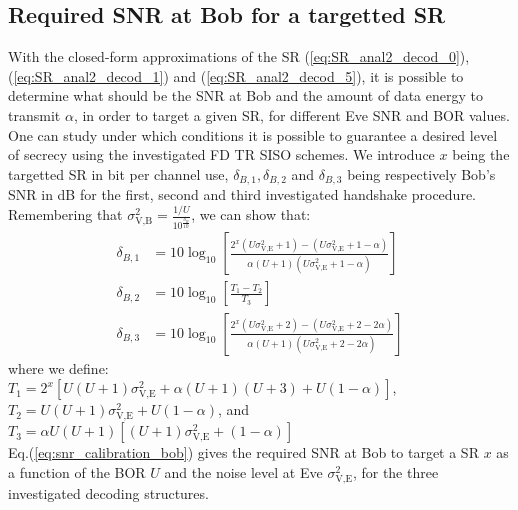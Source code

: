 \documentclass[journal,comsoc]{IEEEtran}
\begin{document}
\subsection{Required SNR at Bob for a targetted SR}
 \label{sec:required-snr-at-bob-for-a-targetted-sr}
With the closed-form approximations of the SR (\ref{eq:SR_anal2_decod_0}), (\ref{eq:SR_anal2_decod_1}) and (\ref{eq:SR_anal2_decod_5}), it is possible to determine what should be the SNR at Bob and the amount of data energy to transmit $\alpha$, in order to target a given SR, for different Eve SNR and BOR values. One can study under which conditions it is possible to guarantee a desired level of secrecy using the investigated FD TR SISO schemes. We introduce $x$ being the targetted SR in bit per channel use, $\delta_{B,1}, \delta_{B,2}$ and $\delta_{B,3}$ being respectively Bob's SNR in dB for the first, second and third investigated handshake procedure. Remembering that $\sigma^2_{\text{V,B}} = \frac{1/U}{10^{\frac{\delta_B}{10}}}$, we can show that:
\begin{equation}
\begin{split}
	\delta_{B,1} &= 10 \log_{10}  \left[\frac{2^x(U\sigma_{\text{V,E}}^2+1) - (U\sigma_{\text{V,E}}^2+1-\alpha)}{\alpha(U+1)(U\sigma_{\text{V,E}}^2+1-\alpha)}\right] \\
	\delta_{B,2} &= 10 \log_{10}  \left[\frac{T_1 - T_2}{T_3}\right] \\
	\delta_{B,3} &= 10 \log_{10} \left[  \frac{2^x(U\sigma_{\text{V,E}}^2+2) - (U\sigma_{\text{V,E}}^2+2-2\alpha)}{\alpha(U+1)(U\sigma_{\text{V,E}}^2+2-2\alpha)}  \right]
\end{split}
\label{eq:snr_calibration_bob}
\end{equation}
where we define: \\ $T_1 = 2^x\left[U(U+1)\sigma_{\text{V,E}}^2 + \alpha(U+1)(U+3)+
U(1-\alpha)\right]$, \\
$T_2 = U(U+1)\sigma_{\text{V,E}}^2+U(1-\alpha)$, and  \\$T_3 =  \alpha U(U+1)\left[(U+1)\sigma_{\text{V,E}}^2+(1-\alpha)\right]$\\
Eq.(\ref{eq:snr_calibration_bob})  gives the required SNR at Bob to target a SR $x$ as a function of the BOR $U$ and the noise level at Eve $\sigma_{\text{V,E}}^2$, for the three investigated decoding structures.







\end{document}
